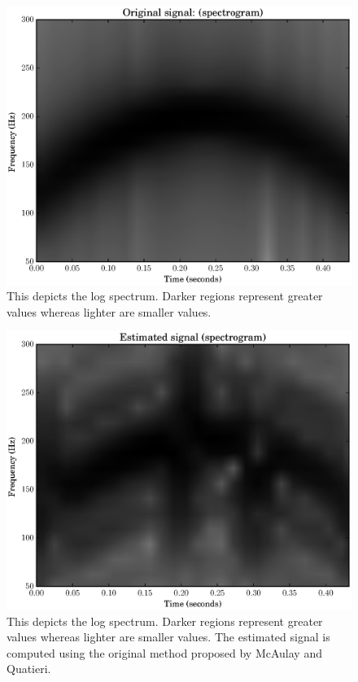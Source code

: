 \documentclass[letterpaper,12pt]{report}
\begin{document}
\begin{figure}
    \includegraphics[width=\textwidth]{plots/mq_cubic_original_spec.eps}
    \caption{This depicts the log spectrum. Darker regions represent greater
        values whereas lighter are smaller values.
    \label{plot:mqcubicoriginalspec}}
\end{figure}

\begin{figure}
    \includegraphics[width=\textwidth]{plots/mq_cubic_estimated_spec.eps}
    \caption{This depicts the log spectrum. Darker regions represent greater
        values whereas lighter are smaller values. The estimated signal is
        computed using the original method proposed by McAulay and Quatieri.
    \label{plot:mqcubicestimatedspec}}
\end{figure}
\end{document}
